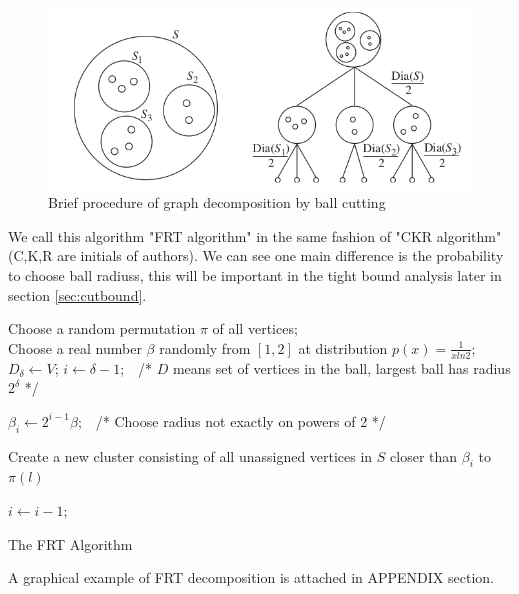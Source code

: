 \documentclass[11pt,twocolumn]{IEEEtran}
\begin{document}
\begin{figure}[hbt]
	\begin{center}
	\includegraphics[scale=0.4]{laminar.png}
	\end{center}
	\caption{Brief procedure of graph decomposition by ball cutting\cite{thispaper}}
	\label{fig:laminar}
\end{figure}
We call this algorithm "FRT algorithm" in the same fashion of "CKR algorithm"(C,K,R are initials of authors).
We can see one main difference is the probability to choose ball radiuss, this will be important
in the tight bound analysis later in section \ref{sec:cutbound}.

\begin{algorithm}[hbt]
\SetAlgoNoLine
  Choose a random permutation $\pi$ of all vertices;\\
  Choose a real number $\beta$ randomly from $[1,2]$ at distribution $p(x) = \frac{1}{xln2}$;\\
  $D_\delta \gets V$; $i\gets \delta-1$;\ \  /* $D$ means set of vertices in the ball, largest ball has radius $2^\delta$ */\\
  {
  	$\beta_i \gets 2^{i-1}\beta$;\ \ /* Choose radius not exactly on powers of 2 */\\
	{
		{
			Create a new cluster consisting of all unassigned vertices in $S$ closer than $\beta_i$ to $\pi(l)$
		}

	}
	$i\gets i-1$;
   }
\caption {The FRT Algorithm}\label{alg:FRT}
\end{algorithm}
A graphical example of FRT decomposition is attached in APPENDIX section.
\end{document}
